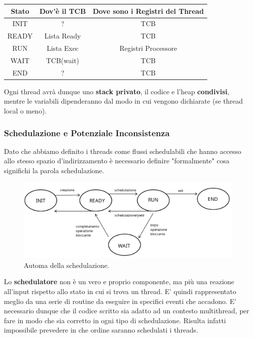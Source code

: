 \documentclass{article}
\begin{document}
\vspace*{5px}

\begin{center}
    \begin{tabular}{ c|c|c } 
    Stato & Dov'è il TCB & Dove sono i Registri del Thread \\ 
        \hline
    INIT & ? & TCB \\ 
    READY & Lista Ready & TCB \\
    RUN & Lista Exec & Registri Processore \\ 
    WAIT & TCB(wait) & TCB \\ 
    END & ? & TCB \\ 

    \hline
    \end{tabular}
    \end{center}

\vspace*{5px}

Ogni thread avrà dunque uno \textbf{stack privato}, il codice e l'heap \textbf{condivisi}, mentre le variabili dipenderanno dal modo in cui vengono
dichiarate (se thread local o meno).

\newpage

\subsubsection{Schedulazione e Potenziale Inconsistenza}

Dato che abbiamo definito i threads come flussi schedulabili che hanno accesso allo stesso spazio d'indirizzamento è necessario definire "formalmente"
cosa significhi la parola schedulazione.

\begin{figure}[htbp]
    \center
    \includegraphics[scale=0.325]{img/automa_schedulatore.png}
    \caption{Automa della schedulazione.}
\end{figure}

Lo \textbf{schedulatore} non è un vero e proprio componente, ma più una reazione all'input rispetto allo stato in cui si trova un thread. E' quindi rappresentato
meglio da una serie di routine da eseguire in specifici eventi che accadono. E' necessario dunque che il codice scritto sia adatto ad un contesto multithread, per
fare in modo che sia corretto in ogni tipo di schedulazione. Risulta infatti impossibile prevedere in che ordine saranno schedulati i threads. 
\end{document}

